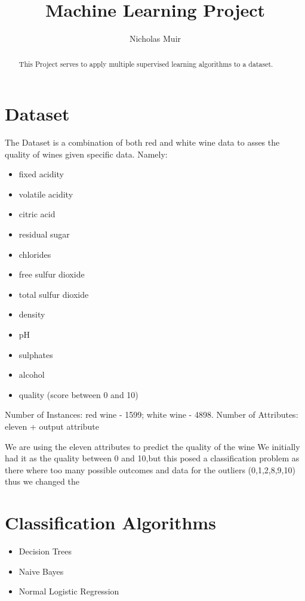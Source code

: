 \documentclass{article}
\title{Machine Learning Project}
\author{Nicholas Muir}
\begin{document}
\maketitle
\begin{abstract}
This Project serves to apply multiple supervised learning algorithms to a dataset.
\end{abstract}



\section{Dataset}

The Dataset is a combination of both red and white wine data to asses the quality of wines given specific data.
Namely:

\begin{itemize}
\item fixed acidity
\item volatile acidity
\item citric acid
\item residual sugar
\item chlorides
\item free sulfur dioxide
\item total sulfur dioxide
\item density
\item pH
\item sulphates
\item alcohol
\item quality (score between 0 and 10)
\end{itemize}

Number of Instances: red wine - 1599; white wine - 4898.
Number of Attributes: eleven + output attribute

We are using the eleven attributes to predict the quality of the wine
We initially had it as the quality between 0 and 10,but this posed a classification problem as there where too many possible outcomes and data for the outliers (0,1,2,8,9,10) thus we changed the


\section{Classification Algorithms}
\begin{itemize}
    \item Decision Trees
    \item Naive Bayes
    \item Normal Logistic Regression
\end{itemize}
\end{document}
